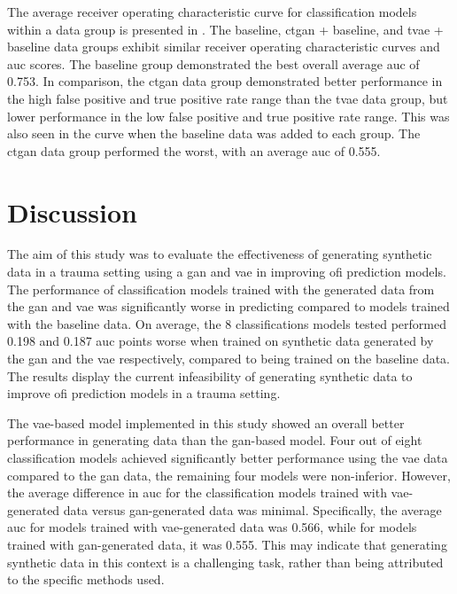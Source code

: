 \documentclass[12pt, a4paper]{article}
\begin{document}
The average receiver operating characteristic curve for classification models within a data group is presented in
. The baseline, \acrshort{ctgan} + baseline, and \acrshort{tvae} + baseline data groups exhibit similar
receiver operating characteristic curves and \acrshort{auc} scores. The baseline group demonstrated the best overall
average \acrshort{auc} of 0.753. In comparison, the \acrshort{ctgan} data group demonstrated better performance in the
high false positive and true positive rate range than the \acrshort{tvae} data group, but lower performance in the low
false positive and true positive rate range. This was also seen in the curve when the baseline data was added to each
group. The \acrshort{ctgan} data group performed the worst, with an average \acrshort{auc} of 0.555.

\section{Discussion}
The aim of this study was to evaluate the effectiveness of generating synthetic data in a trauma setting using a
\acrshort{gan} and \acrshort{vae} in improving \acrshort{ofi} prediction models. The performance of classification
models trained with the generated data from the \acrshort{gan} and \acrshort{vae} was significantly worse in predicting
 compared to models trained with the baseline data. On average, the 8 classifications models tested
performed 0.198 and 0.187 \acrshort{auc} points worse when trained on synthetic data generated by the \acrshort{gan}
and the \acrshort{vae} respectively, compared to being trained on the baseline data. The results display the current
infeasibility of generating synthetic data to improve \acrshort{ofi} prediction models in a trauma setting.

The \acrshort{vae}-based model implemented in this study showed an overall better performance in generating data than
the \acrshort{gan}-based model. Four out of eight classification models achieved significantly better performance using
the \acrshort{vae} data compared to the \acrshort{gan} data, the remaining four models were non-inferior. However, the
average difference in \acrshort{auc} for the classification models trained with \acrshort{vae}-generated data versus
\acrshort{gan}-generated data was minimal. Specifically, the average \acrshort{auc} for models trained with
\acrshort{vae}-generated data was 0.566, while for models trained with \acrshort{gan}-generated data, it was 0.555.
This may indicate that generating synthetic data in this context is a challenging task, rather than being attributed to
the specific methods used.
\end{document}
